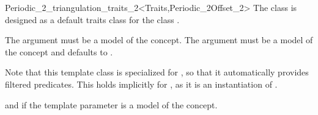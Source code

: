 \ccRefPageBegin


\begin{ccRefClass}{Periodic_2_triangulation_traits_2<Traits,Periodic_2Offset_2>}
  The class \ccRefName is designed as a default traits class for the
  class
  .

  The argument  must be a model of the
   concept. The argument
   must be a model of the concept
   and defaults to .

  Note that this template class is specialized for
  , so that it automatically provides filtered
  predicates. This holds implicitly for
  , as it is an
  instantiation of .



\ccIsModel
%
 and
 if the template
parameter  is a model of the
 concept.


\end{ccRefClass}

\ccRefPageEnd
